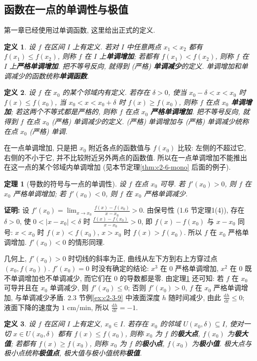 \documentclass[UTF8,openany]{ctexbook}
\theoremstyle{chinesetextbook}
\newtheorem{definition}{定义}[section]
\newtheorem{theorem}{定理}[section]
\newenvironment{cnproof}{\par\indent\textbf{证明:} \ignorespaces}{\par}
\newcommand{\dd}{\mathrm d}
\begin{document}
\subsection{函数在一点的单调性与极值}
第一章已经使用过单调函数, 这里给出正式的定义.
\begin{definition}
设 $f$ 在区间 $I$ 上有定义. 若对 $I$ 中任意两点 $x_1<x_2$ 都有 $f(x_1)\le f(x_2)$, 则称 $f$ 在 $I$ 上\textbf{单调增加}; 若都有 $f(x_1)<f(x_2)$, 则称 $f$ 在 $I$ 上\textbf{严格单调增加}. 把不等号反向, 就得到 (严格) \textbf{单调减少}的定义. 单调增加和单调减少的函数统称\textbf{单调函数}.
\end{definition}
\begin{definition}
设 $f$ 在 $x_0$ 的某个邻域内有定义. 若存在 $\delta>0$, 使当 $x_0-\delta<x<x_0$ 时 $f(x)\le f(x_0)$, 当 $x_0<x<x_0+\delta$ 时 $f(x)\ge f(x_0)$, 则称 $f$ 在点 $x_0$ \textbf{单调增加}; 若这两个不等式都是严格的, 则称 $f$ 在点 $x_0$ \textbf{严格单调增加}. 把不等号反向, 就得到 $f$ 在点 $x_0$ (严格) 单调减少的定义. (严格) 单调增加与 (严格) 单调减少统称在点 $x_0$ (严格) 单调.
\end{definition}
在一点单调增加, 只是把 $x_0$ 附近各点的函数值与 $f(x_0)$ 比较: 左侧的不超过它, 右侧的不小于它, 并不比较附近另外两点的函数值. 所以在一点单调增加不能推出在这一点的某个邻域内单调增加 (见本节定理\ref{thm:c2-6-mono} 后面的例子).
\begin{theorem}[导数的符号与一点的单调性]\label{thm:c2-6-point}
设 $f$ 在点 $x_0$ 可导. 若 $f'(x_0)>0$, 则 $f$ 在 $x_0$ 严格单调增加; 若 $f'(x_0)<0$, 则 $f$ 在 $x_0$ 严格单调减少.
\end{theorem}
\begin{cnproof}
设 $\displaystyle f'(x_0)=\lim_{x\to x_0}\frac{f(x)-f(x_0)}{x-x_0}>0$. 由保号性 (1.6 节定理1(4)), 存在 $\delta>0$, 使 $0<|x-x_0|<\delta$ 时 $\displaystyle\frac{f(x)-f(x_0)}{x-x_0}>0$, 即 $f(x)-f(x_0)$ 与 $x-x_0$ 同号: $x<x_0$ 时 $f(x)<f(x_0)$, $x>x_0$ 时 $f(x)>f(x_0)$. 所以 $f$ 在 $x_0$ 严格单调增加. $f'(x_0)<0$ 的情形同理.
\end{cnproof}
几何上, $f'(x_0)>0$ 时切线的斜率为正, 曲线从左下方到右上方穿过点 $(x_0,f(x_0))$. $f'(x_0)=0$ 时没有确定的结论: $x^3$ 在 $0$ 严格单调增加, $x^2$ 在 $0$ 既不单调增加也不单调减少, 而它们在 $0$ 的导数都是零. 由定理\ref{thm:c2-6-point} 还可知: 若 $f$ 在 $x_0$ 可导并且在 $x_0$ 单调减少, 则 $f'(x_0)\le0$; 否则 $f'(x_0)>0$, $f$ 在 $x_0$ 严格单调增加, 与单调减少矛盾. 2.3 节例\ref{ex:c2-3-9} 中液面深度 $h$ 随时间减少, 由此 $\displaystyle\frac{\dd h}{\dd t}\le0$; 液面下降的速度为 $1$ cm/min, 所以 $\displaystyle\frac{\dd h}{\dd t}=-1$.
\begin{definition}
设 $f$ 在区间 $I$ 上有定义, $x_0\in I$. 若存在 $x_0$ 的邻域 $U(x_0,\delta)\subseteq I$, 使对一切 $x\in U(x_0,\delta)$ 都有 $f(x)\le f(x_0)$, 则称 $x_0$ 为 $f$ 的\textbf{极大点}, $f(x_0)$ 为\textbf{极大值}; 若都有 $f(x)\ge f(x_0)$, 则称 $x_0$ 为 $f$ 的\textbf{极小点}, $f(x_0)$ 为\textbf{极小值}. 极大点与极小点统称\textbf{极值点}, 极大值与极小值统称\textbf{极值}.
\end{definition}
\end{document}

